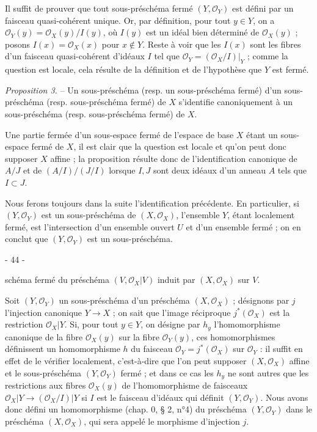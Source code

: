 Il suffit de prouver que tout sous-préschéma fermé $(Y, \mathcal{O}_Y)$ est défini par un faisceau quasi-cohérent unique. Or, par définition, pour tout $y \in Y$, on a $\mathcal{O}_Y(y) = \mathcal{O}_X(y) / I(y)$, où $I(y)$ est un idéal bien déterminé de $\mathcal{O}_X(y)$ ; posons $I(x) = \mathcal{O}_X(x)$ pour $x \notin Y$. Reste à voir que les $I(x)$ sont les fibres d'un faisceau quasi-cohérent d'idéaux $I$ tel que $\mathcal{O}_Y = (\mathcal{O}_X/I)|_Y$ ; comme la question est locale, cela résulte de la définition et de l'hypothèse que $Y$ est fermé.

\emph{Proposition 3.} -- Un sous-préschéma (resp. un sous-préschéma fermé) d'un sous-préschéma (resp. sous-préschéma fermé) de $X$ s'identifie canoniquement à un sous-préschéma (resp. sous-préschéma fermé) de $X$.

Une partie fermée d'un sous-espace fermé de l'espace de base $X$ étant un sous-espace fermé de $X$, il est clair que la question est locale et qu'on peut donc supposer $X$ affine ; la proposition résulte donc de l'identification canonique de $A/J$ et de $(A/I)/(J/I)$ lorsque $I, J$ sont deux idéaux d'un anneau $A$ tels que $I \subset J$.

Nous ferons toujours dans la suite l'identification précédente. En particulier, si $(Y, \mathcal{O}_Y)$ est un sous-préschéma de $(X, \mathcal{O}_X)$, l'ensemble $Y$, étant localement fermé, est l'intersection d'un ensemble ouvert $U$ et d'un ensemble fermé ; on en conclut que $(Y, \mathcal{O}_Y)$ est un sous-préschéma.

\newpage


- 44 -

schéma fermé du préschéma $(V, \mathcal{O}_X|V)$ induit par $(X, \mathcal{O}_X)$ sur $V$.

Soit $(Y, \mathcal{O}_Y)$ un sous-préschéma d'un préschéma $(X, \mathcal{O}_X)$ ; désignons par $j$ l'injection canonique $Y \to X$ ; on sait que l'image réciproque $j^*(\mathcal{O}_X)$ est la restriction $\mathcal{O}_X|Y$. Si, pour tout $y \in Y$, on désigne par $h_y$ l'homomorphisme canonique de la fibre $\mathcal{O}_X(y)$ sur la fibre $\mathcal{O}_Y(y)$, ces homomorphismes définissent un homomorphisme $h$ du faisceau $\mathcal{O}_Y = j^*(\mathcal{O}_X)$ sur $\mathcal{O}_Y$ : il suffit en effet de le vérifier localement, c'est-à-dire que l'on peut supposer $(X, \mathcal{O}_X)$ affine et le sous-préschéma $(Y, \mathcal{O}_Y)$ fermé ; et dans ce cas les $h_y$ ne sont autres que les restrictions aux fibres $\mathcal{O}_X(y)$ de l'homomorphisme de faisceaux $\mathcal{O}_X|Y \to (\mathcal{O}_X/I)|Y$ si $I$ est le faisceau d'idéaux qui définit $(Y, \mathcal{O}_Y)$. Nous avons donc défini un homomorphisme (chap. 0, § 2, n°4) du préschéma $(Y, \mathcal{O}_Y)$ dans le préschéma $(X, \mathcal{O}_X)$, qui sera appelé le morphisme d'injection $j$.

